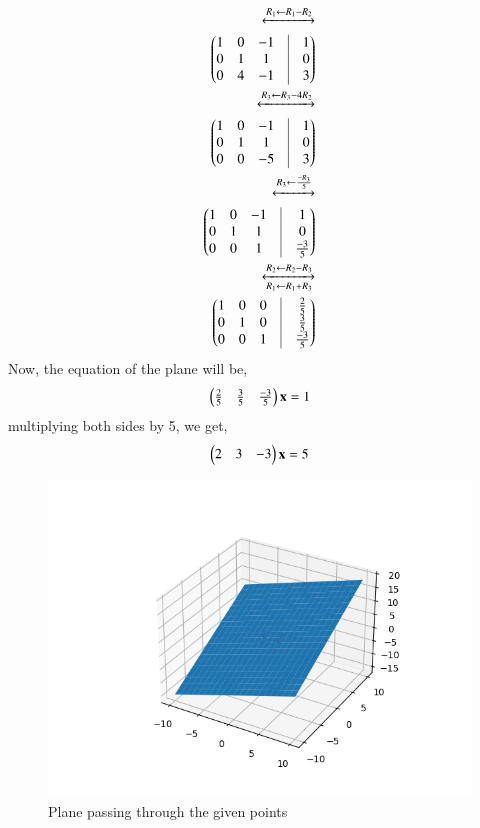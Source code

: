\documentclass[A4,10pt,twocolumn]{IEEEtran}
\begin{document}
\begin{align}
\xleftrightarrow{R_1 \leftarrow R_1- R_2}\\
\myvec{1&0&-1&\vrule&1\\0&1&1&\vrule&0\\0&4&-1&\vrule&3}\\
\xleftrightarrow{R_3 \leftarrow R_3 - 4R_2}\\
\myvec{1&0&-1&\vrule&1\\0&1&1&\vrule&0\\0&0&-5&\vrule&3}\\
\xleftrightarrow{R_3 \leftarrow \frac{- R_3}{5}}\\
\myvec{1&0&-1&\vrule&1\\0&1&1&\vrule&0\\0&0&1&\vrule&\frac{-3}{5}}\\
\xleftrightarrow[R_1 \leftarrow R_1 + R_3]{R_2 \leftarrow R_2 - R_3}\\
\myvec{1&0&0& \vrule& \frac{2}{5}  \\ 0&1&0& \vrule& \frac{3}{5} \\ 0&0&1& \vrule& \frac{-3}{5}}
\end{align}
Now, the equation of the plane will be,
\begin{align}
\begin{pmatrix}\frac{2}{5} & \frac{3}{5} & \frac{-3}{5}\end{pmatrix} \mathbf{x} = 1
\end{align}
multiplying both sides by 5, we get,
\begin{align}
\begin{pmatrix}2 & 3 & -3\end{pmatrix} \mathbf{x} = 5
\end{align}
\begin{figure}[h!]
  \centering
   \includegraphics[width=\columnwidth]{figs/plane_b.png}
    \caption{Plane passing through the given points }
     \label{fig:2}
     \end{figure} 
\end{document}
